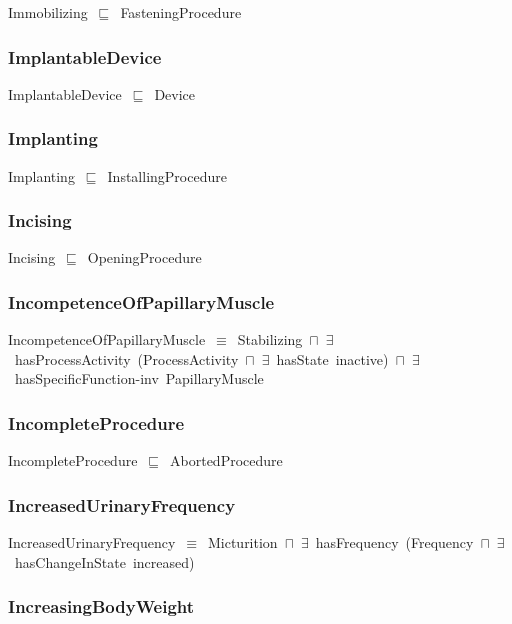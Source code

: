 \documentclass{article}
\begin{document}
Immobilizing~\ensuremath{\sqsubseteq}~FasteningProcedure~

\subsubsection*{ImplantableDevice}

ImplantableDevice~\ensuremath{\sqsubseteq}~Device~

\subsubsection*{Implanting}

Implanting~\ensuremath{\sqsubseteq}~InstallingProcedure~

\subsubsection*{Incising}

Incising~\ensuremath{\sqsubseteq}~OpeningProcedure~

\subsubsection*{IncompetenceOfPapillaryMuscle}

IncompetenceOfPapillaryMuscle~\ensuremath{\equiv}~Stabilizing~\ensuremath{\sqcap}~\ensuremath{\exists}~hasProcessActivity~(ProcessActivity~\ensuremath{\sqcap}~\ensuremath{\exists}~hasState~inactive)~\ensuremath{\sqcap}~\ensuremath{\exists}~hasSpecificFunction-inv~PapillaryMuscle

\subsubsection*{IncompleteProcedure}

IncompleteProcedure~\ensuremath{\sqsubseteq}~AbortedProcedure~

\subsubsection*{IncreasedUrinaryFrequency}

IncreasedUrinaryFrequency~\ensuremath{\equiv}~Micturition~\ensuremath{\sqcap}~\ensuremath{\exists}~hasFrequency~(Frequency~\ensuremath{\sqcap}~\ensuremath{\exists}~hasChangeInState~increased)

\subsubsection*{IncreasingBodyWeight}
\end{document}
